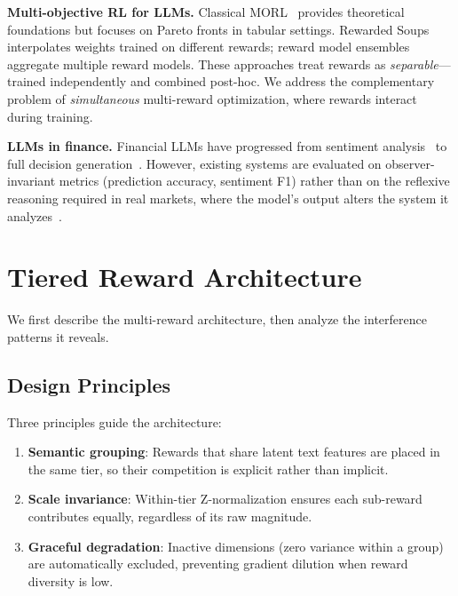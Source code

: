 \documentclass[sigconf]{acmart}
\begin{document}
\textbf{Multi-objective RL for LLMs.}
Classical MORL~\cite{roijers2013survey} provides theoretical foundations but focuses on Pareto fronts in tabular settings. Rewarded Soups~\cite{rame2024rewarded} interpolates weights trained on different rewards; reward model ensembles~\cite{coste2023reward} aggregate multiple reward models. These approaches treat rewards as \textit{separable}---trained independently and combined post-hoc. We address the complementary problem of \textit{simultaneous} multi-reward optimization, where rewards interact during training.

\textbf{LLMs in finance.}
Financial LLMs have progressed from sentiment analysis~\cite{araci2019finbert} to full decision generation~\cite{wu2023bloomberggpt, yang2023fingpt}. However, existing systems are evaluated on observer-invariant metrics (prediction accuracy, sentiment F1) rather than on the reflexive reasoning required in real markets, where the model's output alters the system it analyzes~\cite{anon2026reflexive}.

\section{Tiered Reward Architecture}
\label{sec:architecture}

We first describe the multi-reward architecture, then analyze the interference patterns it reveals.

\subsection{Design Principles}

Three principles guide the architecture:
\begin{enumerate}
    \item \textbf{Semantic grouping}: Rewards that share latent text features are placed in the same tier, so their competition is explicit rather than implicit.
    \item \textbf{Scale invariance}: Within-tier Z-normalization ensures each sub-reward contributes equally, regardless of its raw magnitude.
    \item \textbf{Graceful degradation}: Inactive dimensions (zero variance within a group) are automatically excluded, preventing gradient dilution when reward diversity is low.
\end{enumerate}
\end{document}
